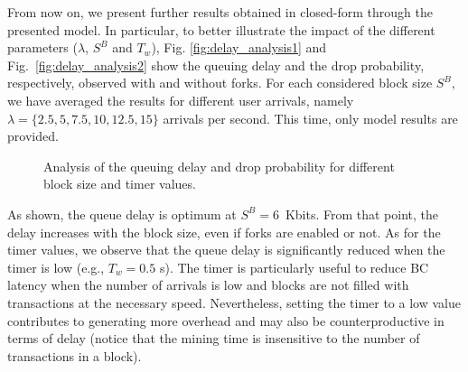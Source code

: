 \documentclass[conference]{IEEEtran}
\theoremstyle{definition}
\begin{document}
From now on, we present further results obtained in closed-form through the presented model. In particular, to better illustrate the impact of the different parameters ($\lambda$, $S^B$ and $T_w$), Fig. \ref{fig:delay_analysis1} and Fig.~\ref{fig:delay_analysis2} show the queuing delay and the drop probability, respectively, observed with and without forks. For each considered block size $S^B$, we have averaged the results for different user arrivals, namely $\lambda=\{2.5, 5, 7.5, 10, 12.5, 15\}$ arrivals per second. This time, only model results are provided.

\begin{figure}[ht!]
\centering
{} 
\caption{Analysis of the queuing delay and drop probability for different block size and timer values.}
\label{fig:delay_analysis}
\end{figure}

As shown, the queue delay is optimum at $S^B = 6$~Kbits. From that point, the delay increases with the block size, even if forks are enabled or not. As for the timer values, we observe that the queue delay is significantly reduced when the timer is low (e.g., $T_w = 0.5$ s). The timer is particularly useful to reduce BC latency when the number of arrivals is low and blocks are not filled with transactions at the necessary speed. Nevertheless, setting the timer to a low value contributes to generating more overhead and may also be counterproductive in terms of delay (notice that the mining time is insensitive to the number of transactions in a block).
\end{document}

